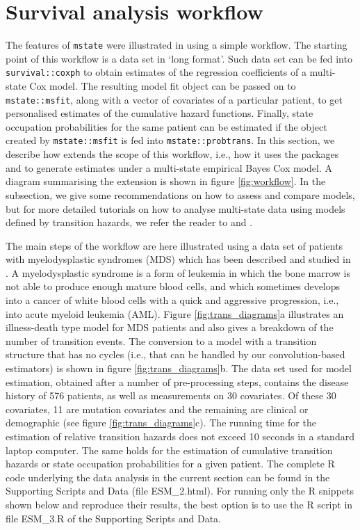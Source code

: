 \section{Survival analysis workflow}
The features of \lstinline!mstate! were illustrated in  \citet{Wreede2010} using a simple workflow. The starting point of this workflow is a data set in `long format'. Such data set can be fed into \lstinline!survival::coxph! to obtain estimates of the regression coefficients of a multi-state Cox model. The resulting model fit object can be passed on to  \lstinline!mstate::msfit!, along with a vector of covariates of a particular patient, to get personalised estimates of the cumulative hazard functions. 
Finally, state occupation probabilities for the same patient can be estimated if the object created by \lstinline!mstate::msfit! is fed into  \lstinline!mstate::probtrans!. 
In this section, we describe how  extends the scope of this workflow, i.e., how it uses the packages  and  to generate estimates under a multi-state empirical Bayes Cox model.  A diagram summarising the extension is shown in figure \ref{fig:workflow}. In the  subsection, we give some recommendations on how to assess and compare models, but for more detailed tutorials on how to analyse multi-state data using models defined by transition hazards, we refer the reader to \citet{Putter2007tutorial} and \citet{Putter2011tutorial}.

 The main steps of the  workflow are here illustrated using a data set of patients with myelodysplastic syndromes (MDS) which has been described and studied in \citet{Papaemmanuil2013}. A myelodysplastic syndrome is a form of leukemia in which the bone marrow is not able to produce enough mature blood cells, and which sometimes develops into a cancer of white blood cells with a quick and aggressive progression, i.e., into acute myeloid leukemia (AML). Figure \ref{fig:trans_diagrams}a illustrates an illness-death type model for MDS patients and also gives a breakdown of the number of transition events. 
 The conversion to a model with a transition structure that has no cycles (i.e., that can be handled by our convolution-based estimators) is shown in figure \ref{fig:trans_diagrams}b. The data set used for model estimation, obtained after a number of pre-processing steps,  contains the disease history of 576 patients, as well as measurements on 30 covariates. Of these 30 covariates, 11 are mutation covariates and the remaining are clinical or demographic (see figure \ref{fig:trans_diagrams}c). 
 The running time for the estimation of relative transition hazards does not exceed 10 seconds in a standard laptop computer. The same holds for the estimation of  cumulative transition hazards or state occupation probabilities for a given patient. The complete R code underlying the data analysis in the current section can be found in the Supporting Scripts and Data (file ESM\_2.html). For running only the R snippets shown below and reproduce their results, the best option is to use the R script in file ESM\_3.R of the Supporting Scripts and Data.


